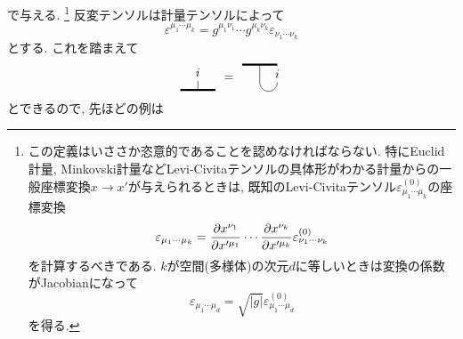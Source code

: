\documentclass[dvipdfmx]{jsarticle}
\begin{document}
で与える.
\footnote{
    この定義はいささか恣意的であることを認めなければならない.
    特にEuclid計量, Minkovski計量などLevi-Civitaテンソルの具体形がわかる計量からの一般座標変換$x\to x'$が与えられるときは, 既知のLevi-Civitaテンソル$\varepsilon^{(0)}_{\mu_1\cdots\mu_k}$の座標変換
    \begin{equation*}
        \varepsilon_{\mu_1\cdots\mu_k}
        =
        \pdv{x^{\nu_1}}{x'^{\mu_1}}
        \cdots
        \pdv{x^{\nu_k}}{x'^{\mu_k}}
        \varepsilon^{(0)}_{\nu_1\cdots\nu_k}
    \end{equation*}
    を計算するべきである.
    $k$が空間(多様体)の次元$d$に等しいときは変換の係数がJacobianになって
    \begin{equation*}
        \varepsilon_{\mu_1\cdots\mu_d}
        =
        \sqrt{|g|}
        \varepsilon^{(0)}_{\mu_1\cdots\mu_d}
    \end{equation*}
    を得る.
}
反変テンソルは計量テンソルによって
\begin{equation*}
    \varepsilon^{\mu_1\cdots\mu_k}
    =
    g^{\mu_1\nu_1}
    \cdots
    g^{\mu_k\nu_k}
    \varepsilon_{\nu_1\cdots\nu_k}
\end{equation*}
とする.
これを踏まえて
\begin{equation*}
    \vcenter{\hbox{
        \begin{tikzpicture}
            \draw[ultra thick](0,0)--++(1,0);
            \draw(0.5,0)--++(0,.25)node[anchor=south]{$i$};
        \end{tikzpicture}
    }}
    =
    \vcenter{\hbox{
        \begin{tikzpicture}
            \draw[ultra thick](0,0)--++(1,0);
            \draw(0.5,0)--++(0,-.5)arc(-180:0:.25)
            node[anchor=south]{$i$};
        \end{tikzpicture}
    }}
\end{equation*}
とできるので, 先ほどの例は
\end{document}

